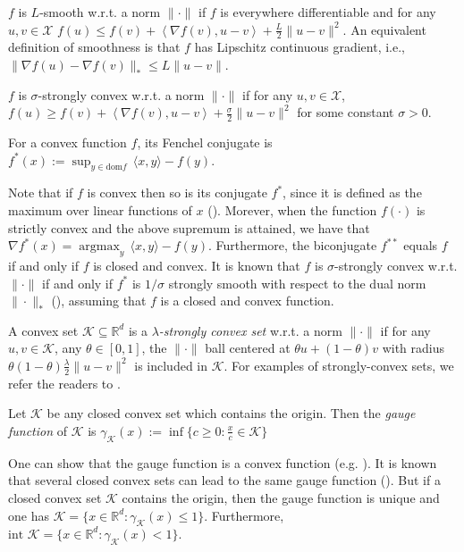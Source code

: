 \documentclass[final,12pt]{colt2018} %
\def\reals{\mathbb{R}}
\def\g{\gamma_{\K}}
\def\reals{\mathbb{R}}
\def\K{\mathcal{K}}
\newcommand{\lr}[2]{\left\langle#1,#2\right\rangle}
\newcommand{\XX}{\mathcal{X}}
\begin{document}
\begin{definition}
$f$ is $L$-smooth w.r.t. a norm $\| \cdot \|$ if $f$ is everywhere differentiable and for any $u,v\in \XX$
$f( u ) \leq f(v) + \lr{\nabla f(v)}{ u - v } + \frac{L}{2} \| u - v \|^2$. 
An equivalent definition of smoothness is that $f$ has Lipschitz continuous gradient, i.e.,
$\| \nabla f(u) - \nabla f(v) \|_*\leq L \| u - v\|$.
\end{definition}

\begin{definition}
$f$ is $\sigma$-strongly convex w.r.t. a norm $\| \cdot \|$ if for any $u,v\in\XX$, $f( u ) \geq f(v) + \lr{\nabla f(v)}{ u - v } + \frac{\sigma}{2} \| u - v \|^2$ for some constant $\sigma>0$.
\end{definition}

\begin{definition}
For a convex function $f$, its Fenchel conjugate is $f^*(x) :=\displaystyle  \sup_{ y \in \text{dom} f } \,  \langle x, y \rangle - f(y)$.
\end{definition}
Note that if $f$ is convex then so is its conjugate $f^*$, since it is defined as the maximum over linear functions of $x$ (\cite{B04}). Morever, when the function $f(\cdot)$ is strictly convex and the above supremum is attained, we have that $\nabla f^*(x) = \displaystyle  \mathop{\arg\max}_y  \,  \langle x, y \rangle - f(y) $. 
Furthermore, the biconjugate $f^{**}$ equals $f$ if and only if $f$ is closed and convex.
It is known that $f$ is $\sigma$-strongly convex w.r.t. $\| \cdot \|$ if and only if $f^\ast$ is $1/\sigma$ strongly smooth 
with respect to the dual norm $\| \cdot \|_*$ (\cite{KST09}), assuming that $f$ is a closed and convex function.


\begin{definition}
A convex set $\K \subseteq \reals^d$ is a \emph{$\lambda$-strongly convex set} w.r.t. a norm $\| \cdot \|$ 
if for any $u, v \in \K$, any $\theta \in [0,1]$,
the $\| \cdot \|$ ball centered at $ \theta u + ( 1 - \theta) v$ with radius 
$\theta (1 - \theta) \frac{\lambda}{2} \| u - v \|^2$ is included in $\K$.
For examples of strongly-convex sets, we refer the readers to \citep{D15}. 	
\end{definition}

\begin{definition}
Let $\K$ be any closed convex set which contains the origin.
Then the \emph{gauge function} of $\K$ is $\g(x) := \inf \{ c \geq 0: \frac{x}{c} \in \K \}$
\end{definition}
One can show that the gauge function is a convex function (e.g. \cite{R96}). 
It is known that several closed convex sets can lead to the same gauge function (\cite{B13}).
But if a closed convex set $\K$ contains the origin, then the gauge function is unique and one has
$\K = \{ x \in \reals^d: \g(x)\leq 1 \}$.
Furthermore, $\text{int } \K = \{ x \in \reals^d: \g(x)< 1 \}.$
\end{document}
